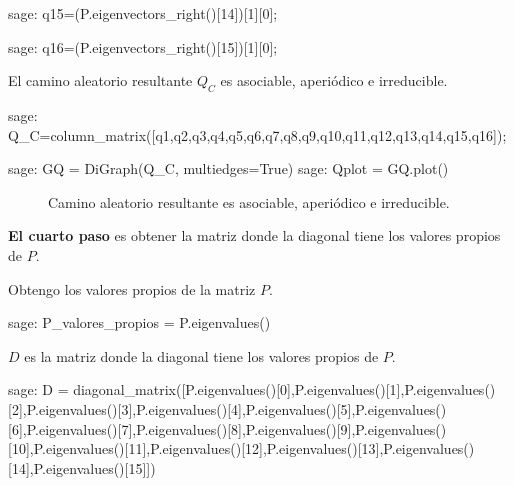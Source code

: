\begin{sagecommandline}
    sage: q15=(P.eigenvectors_right()[14])[1][0];
\end{sagecommandline}

\begin{sagecommandline}
    sage: q16=(P.eigenvectors_right()[15])[1][0];
\end{sagecommandline}

\par El camino aleatorio resultante $Q_C$ es asociable, aperiódico e irreducible.

\begin{sagecommandline}
    sage: Q_C=column_matrix([q1,q2,q3,q4,q5,q6,q7,q8,q9,q10,q11,q12,q13,q14,q15,q16]);
\end{sagecommandline}

\begin{sagecommandline}
    sage: GQ = DiGraph(Q_C, multiedges=True)
    sage: Qplot = GQ.plot()
\end{sagecommandline}
\begin{figure}[H]
    \centering
    \label{caminoZ_2}
    \caption{Camino aleatorio resultante es asociable, aperiódico e irreducible.}
\end{figure}

\par \textbf{El cuarto paso} es obtener la matriz donde la diagonal tiene los valores propios de $P$.
\par Obtengo los valores propios de la matriz $P$.
\begin{sagecommandline}
    sage: P_valores_propios = P.eigenvalues()
\end{sagecommandline}

\par $D$ es la matriz donde la diagonal tiene los valores propios de $P$.
\begin{sagecommandline}
    sage: D = diagonal_matrix([P.eigenvalues()[0],P.eigenvalues()[1],P.eigenvalues()[2],P.eigenvalues()[3],P.eigenvalues()[4],P.eigenvalues()[5],P.eigenvalues()[6],P.eigenvalues()[7],P.eigenvalues()[8],P.eigenvalues()[9],P.eigenvalues()[10],P.eigenvalues()[11],P.eigenvalues()[12],P.eigenvalues()[13],P.eigenvalues()[14],P.eigenvalues()[15]])
\end{sagecommandline}

